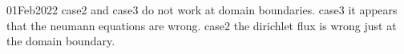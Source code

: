 01Feb2022
case2 and case3  do not work at domain boundaries.   case3 it appears
that the neumann equations are wrong.   case2 the dirichlet flux is
wrong just at the domain boundary.
